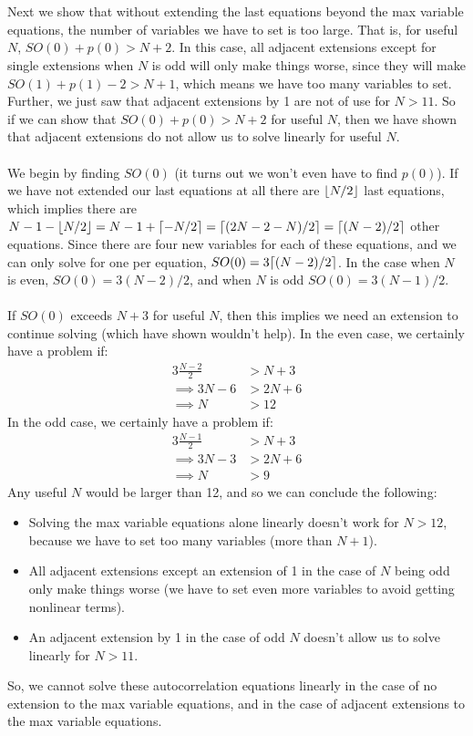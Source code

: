 \documentclass[a4paper]{article}
\DeclarePairedDelimiter{\ceil}{\lceil}{\rceil}
\DeclarePairedDelimiter\floor{\lfloor}{\rfloor}
\begin{document}
\\\\
Next we show that without extending the last equations beyond the max variable equations, the number of variables we have to set is too large. That is, for useful $N$, $SO(0) + p(0) > N + 2$. In this case, all adjacent extensions except for single extensions when $N$ is odd will only make things worse, since they will make $SO(1) + p(1)-2 > N+1$, which means we have too many variables to set. Further, we just saw that adjacent extensions by 1 are not of use for $N > 11$. So if we can show that $SO(0) + p(0) > N + 2$ for useful $N$, then we have shown that adjacent extensions do not allow us to solve linearly for useful $N$.
\\\\
We begin by finding $SO(0)$ (it turns out we won't even have to find $p(0)$). If we have not extended our last equations at all there are $\floor{N/2}$ last equations, which implies there are $N-1-\floor{N/2} = N-1+\ceil{-N/2}= \ceil{(2N-2-N)/2} = \ceil{(N-2)/2}$ other equations. Since there are four new variables for each of these equations, and we can only solve for one per equation, $SO(0) = 3 \ceil{(N-2)/2}$. In the case when $N$ is even, $SO(0) = 3(N-2)/2$, and when $N$ is odd $SO(0) = 3(N-1)/2$.
\\\\
If $SO(0)$ exceeds $N+3$ for useful $N$, then this implies we need an extension to continue solving (which have shown wouldn't help). In the even case, we certainly have a problem if:
\begin{align*}
3 \frac{N-2}{2} &> N+3 \\
\implies 3N-6 &> 2N + 6 \\
\implies N &> 12
\end{align*}
In the odd case, we certainly have a problem if:
\begin{align*}
3 \frac{N-1}{2} &> N+3 \\
\implies 3N-3 &> 2N + 6 \\
\implies N &> 9
\end{align*}
Any useful $N$ would be larger than 12, and so we can conclude the following:
\begin{itemize}
\item Solving the max variable equations alone linearly doesn't work for $N > 12$, because we have to set too many variables (more than $N+1$).
\item All adjacent extensions except an extension of 1 in the case of $N$ being odd only make things worse (we have to set even more variables to avoid getting nonlinear terms).
\item An adjacent extension by 1 in the case of odd $N$ doesn't allow us to solve linearly for $N > 11$.
\end{itemize}
So, we cannot solve these autocorrelation equations linearly in the case of no extension to the max variable equations, and in the case of adjacent extensions to the max variable equations.
\clearpage
\end{document}
